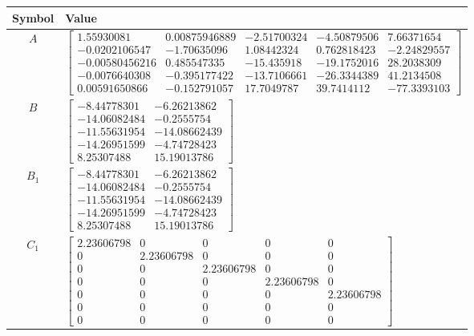 \begin{tabular}{cl}
\hline
  Symbol  & Value                                                                                                                                                                                                                                                                                                                                                                                                 \\
\hline
   $A$    & $\left[\begin{matrix}1.55930081 & 0.00875946889 & -2.51700324 & -4.50879506 & 7.66371654\\-0.0202106547 & -1.70635096 & 1.08442324 & 0.762818423 & -2.24829557\\-0.00580456216 & 0.485547335 & -15.435918 & -19.1752016 & 28.2038309\\-0.0076640308 & -0.395177422 & -13.7106661 & -26.3344389 & 41.2134508\\0.00591650866 & -0.152791057 & 17.7049787 & 39.7414112 & -77.3393103\end{matrix}\right]$ \\
   $B$    & $\left[\begin{matrix}-8.44778301 & -6.26213862\\-14.06082484 & -0.2555754\\-11.55631954 & -14.08662439\\-14.26951599 & -4.74728423\\8.25307488 & 15.19013786\end{matrix}\right]$                                                                                                                                                                                                                      \\
 $B_{1}$  & $\left[\begin{matrix}-8.44778301 & -6.26213862\\-14.06082484 & -0.2555754\\-11.55631954 & -14.08662439\\-14.26951599 & -4.74728423\\8.25307488 & 15.19013786\end{matrix}\right]$                                                                                                                                                                                                                      \\
 $C_{1}$  & $\left[\begin{matrix}2.23606798 & 0 & 0 & 0 & 0\\0 & 2.23606798 & 0 & 0 & 0\\0 & 0 & 2.23606798 & 0 & 0\\0 & 0 & 0 & 2.23606798 & 0\\0 & 0 & 0 & 0 & 2.23606798\\0 & 0 & 0 & 0 & 0\\0 & 0 & 0 & 0 & 0\end{matrix}\right]$                                                                                                                                                                             \\

\end{tabular}
